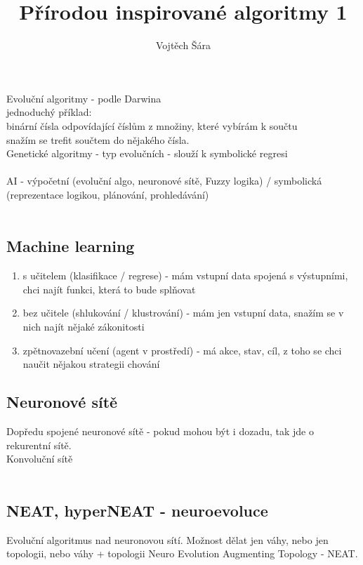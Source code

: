 \documentclass{article}
\title{Přírodou inspirované algoritmy 1}
\author{Vojtěch Šára}
\begin{document}
\maketitle
Evoluční algoritmy - podle Darwina\\
jednoduchý příklad:\\
binární čísla odpovídající číslům z množiny, které vybírám k součtu\\
snažím se trefit součtem do nějakého čísla.\\
Genetické algoritmy - typ evolučních - slouží k symbolické regresi\\\\

AI - výpočetní (evoluční algo, neuronové sítě, Fuzzy logika) / symbolická (reprezentace logikou, plánování, prohledávání)\\\\

\subsection{Machine learning}
\begin{enumerate}
    \item s učitelem (klasifikace / regrese) - mám vstupní data spojená s výstupními, chci najít funkci, která to bude splňovat
    \item bez učitele (shlukování / klustrování) - mám jen vstupní data, snažím se v nich najít nějaké zákonitosti 
    \item zpětnovazební učení (agent v prostředí) - má akce, stav, cíl, z toho se chci naučit nějakou strategii chování
\end{enumerate}

\subsection{Neuronové sítě}
Dopředu spojené neuronové sítě - pokud mohou být i dozadu, tak jde o rekurentní sítě.\\
Konvoluční sítě \\\\

\subsection{NEAT, hyperNEAT - neuroevoluce}
Evoluční algoritmus nad neuronovou sítí. Možnost dělat jen váhy, nebo jen topologii, nebo váhy + topologii
Neuro Evolution Augmenting Topology - NEAT. 
\end{document}
